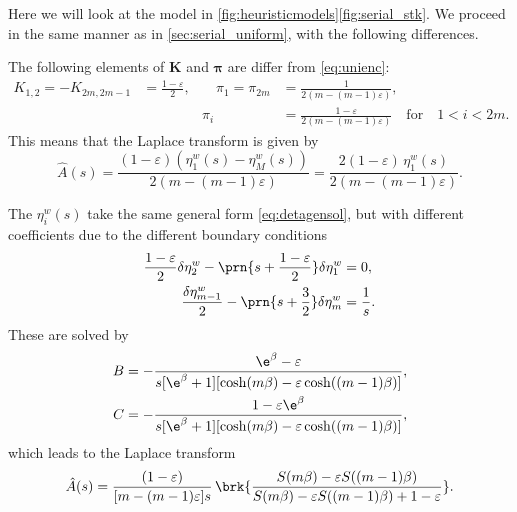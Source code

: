 \documentclass[12pt]{article}
\newcommand{\eqm}{\pi}
\newcommand{\eq}{\boldsymbol{\eqm}}
\newcommand{\etwm}{\eta^w}
\newcommand{\encm}{K}
\newcommand{\enc}{\mathbf{\encm}}
\begin{document}
Here we will look at the model in \cref{fig:heuristicmodels}\ref{fig:serial_stk}.
We proceed in the same manner as in \cref{sec:serial_uniform}, with the following differences.

The following elements of \(\enc\) and \(\eq\) are differ from \eqref{eq:unienc}:
%
\begin{equation}\label{eq:stickyenc}
  \begin{aligned}
  \encm_{1,2} = -\encm_{2m,2m-1} &= \frac{1-\varepsilon}{2},
  &\quad
  \eqm_1 = \eqm_{2m} &= \frac{1}{2(m-(m-1)\varepsilon)},
  \\ &&
  \eqm_i &=  \frac{1-\varepsilon}{2(m-(m-1)\varepsilon)}
  \quad\text{for}\quad 1<i<2m.
  \end{aligned}
\end{equation}
%
This means that the Laplace transform is given by
%
\begin{equation}\label{eq:stickyareaeta}
  \hat{A}(s) = \frac{(1-\varepsilon)(\etwm_1(s)-\etwm_M(s))}
                    {2(m-(m-1)\varepsilon)}
       = \frac{2(1-\varepsilon)\, \etwm_1(s)}{2(m-(m-1)\varepsilon)}.
\end{equation}
%

The \(\etwm_i(s)\) take the same general form \eqref{eq:detagensol}, but with different coefficients due to the different boundary conditions
%
\begin{equation}\label{eq:detabndsticky}
\begin{aligned}
  \frac{1 - \varepsilon}{2} \delta \etwm_2 
    - \prn{s+\frac{1-\varepsilon}{2}} \delta \etwm_1 
    &= 0, \\
  \frac{\delta \etwm_{m-1}}{2} 
    - \prn{s+\frac{3}{2}} \delta \etwm_{m} 
    &= \frac{1}{s}.
\end{aligned}
\end{equation}
%
These are solved by
%
\begin{equation}\label{eq:stickycoeffs}
\begin{aligned}
  B &= -\frac{\e^{\beta} - \varepsilon}
      {s [\e^{\beta} + 1] [\cosh(m\beta) - \varepsilon \cosh((m-1)\beta)]}, \\
  C &= -\frac{1 - \varepsilon\e^{\beta}}
      {s [\e^{\beta} + 1] [\cosh(m\beta) - \varepsilon \cosh((m-1)\beta)]},
\end{aligned}
\end{equation}
%
which leads to the Laplace transform
%
\begin{equation}\label{eq:stickylaplace}
  \hat{A}(s) = \frac{(1-\varepsilon)}{[m-(m-1)\varepsilon]s} \,
      \brk{\frac{S(m\beta) - \varepsilon S((m-1)\beta)}
      {S(m\beta) - \varepsilon S((m-1)\beta) + 1 - \varepsilon}}.
\end{equation}
%
\end{document}
